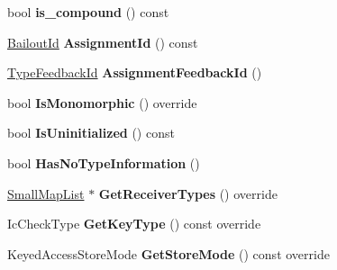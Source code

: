 \begin{DoxyCompactItemize}
\item 
bool {\bfseries is\+\_\+compound} () const \hypertarget{classv8_1_1internal_1_1_assignment_a0cb27b55cac412fecd1aca1c1d01e56e}{}\label{classv8_1_1internal_1_1_assignment_a0cb27b55cac412fecd1aca1c1d01e56e}

\item 
\hyperlink{classv8_1_1internal_1_1_bailout_id}{Bailout\+Id} {\bfseries Assignment\+Id} () const \hypertarget{classv8_1_1internal_1_1_assignment_a0cb08aa8aee8e7a0ae8dc7de7cadb2ec}{}\label{classv8_1_1internal_1_1_assignment_a0cb08aa8aee8e7a0ae8dc7de7cadb2ec}

\item 
\hyperlink{classv8_1_1internal_1_1_type_feedback_id}{Type\+Feedback\+Id} {\bfseries Assignment\+Feedback\+Id} ()\hypertarget{classv8_1_1internal_1_1_assignment_a0a9f6a4eccedd5dd4284a777434fce7b}{}\label{classv8_1_1internal_1_1_assignment_a0a9f6a4eccedd5dd4284a777434fce7b}

\item 
bool {\bfseries Is\+Monomorphic} () override\hypertarget{classv8_1_1internal_1_1_assignment_a4b95b0d60f6c2f65f9b330043011887f}{}\label{classv8_1_1internal_1_1_assignment_a4b95b0d60f6c2f65f9b330043011887f}

\item 
bool {\bfseries Is\+Uninitialized} () const \hypertarget{classv8_1_1internal_1_1_assignment_abacaffac4117d1d753710b8b0ec0b2dc}{}\label{classv8_1_1internal_1_1_assignment_abacaffac4117d1d753710b8b0ec0b2dc}

\item 
bool {\bfseries Has\+No\+Type\+Information} ()\hypertarget{classv8_1_1internal_1_1_assignment_a26d9108311c75ce75fe2557750852600}{}\label{classv8_1_1internal_1_1_assignment_a26d9108311c75ce75fe2557750852600}

\item 
\hyperlink{classv8_1_1internal_1_1_small_map_list}{Small\+Map\+List} $\ast$ {\bfseries Get\+Receiver\+Types} () override\hypertarget{classv8_1_1internal_1_1_assignment_a2251a0bb7e6764324d9b5148f069c087}{}\label{classv8_1_1internal_1_1_assignment_a2251a0bb7e6764324d9b5148f069c087}

\item 
Ic\+Check\+Type {\bfseries Get\+Key\+Type} () const  override\hypertarget{classv8_1_1internal_1_1_assignment_adf7a22f921c8fb728826a84bbe26b382}{}\label{classv8_1_1internal_1_1_assignment_adf7a22f921c8fb728826a84bbe26b382}

\item 
Keyed\+Access\+Store\+Mode {\bfseries Get\+Store\+Mode} () const  override\hypertarget{classv8_1_1internal_1_1_assignment_ab48c22ae66b5d57d0db5e8aaf39af218}{}\label{classv8_1_1internal_1_1_assignment_ab48c22ae66b5d57d0db5e8aaf39af218}


\end{DoxyCompactItemize}

